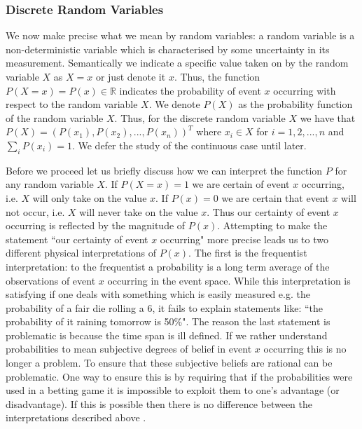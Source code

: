 \documentclass[../masters.tex]{subfiles}
\begin{document}
\subsubsection{Discrete Random Variables}

We now make precise what we mean by random variables: a random variable is a non-deterministic variable which is characterised by some uncertainty in its measurement. Semantically we indicate a specific value taken on by the random variable $X$ as $X=x$ or just denote it $x$. Thus, the function $P(X=x)=P(x) \in \mathbb{R}$ indicates the probability of event $x$ occurring with respect to the random variable $X$. We denote $P(X)$ as the probability function of the random variable $X$. Thus, for the discrete random variable $X$ we have that $P(X)=(P(x_1),P(x_2),...,P(x_n))^T$ where $x_i \in X$ for $i=1,2,..., n$ and $\sum_i P(x_i) =1$. We defer the study of the continuous case until later.

Before we proceed let us briefly discuss how we can interpret the function $P$ for any random variable $X$. If $P(X=x)=1$ we are certain of event $x$ occurring, i.e. $X$ will only take on the value $x$. If $P(x)=0$ we are certain that event $x$ will not occur, i.e. $X$ will never take on the value $x$. Thus our certainty of event $x$ occurring is reflected by the magnitude of $P(x)$. Attempting to make the statement ``our certainty of event $x$ occurring" more precise leads us to two different physical interpretations of $P(x)$. The first is the frequentist interpretation: to the frequentist a probability is a long term average of the observations of event $x$ occurring in the event space. While this interpretation is satisfying if one deals with something which is easily measured e.g. the probability of a fair die rolling a 6, it fails to explain statements like: ``the probability of it raining tomorrow is 50\%". The reason the last statement is problematic is because the time span is ill defined. If we rather understand probabilities to mean subjective degrees of belief in event $x$ occurring this is no longer a problem. To ensure that these subjective beliefs are rational can be problematic. One way to ensure this is by requiring that if the probabilities were used in a betting game it is impossible to exploit them to one's advantage (or disadvantage). If this is possible then there is no difference between the interpretations described above \cite{koller}. 
\end{document}
